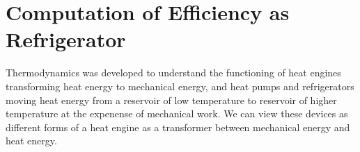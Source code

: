 \section{Computation of Efficiency as Refrigerator}

Thermodynamics was developed to understand the functioning of heat engines transforming 
heat energy to mechanical energy, and heat pumps and refrigerators moving heat energy from 
a reservoir of low temperature to reservoir of higher temperature at the expenense of mechanical work.
We can view these devices as different forms of a heat engine as a transformer between mechanical
energy and heat energy.  
 

